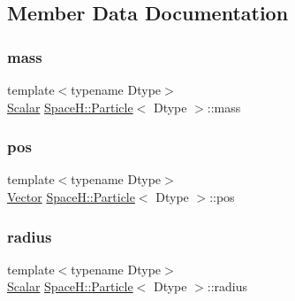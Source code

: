 \subsection{Member Data Documentation}
\mbox{\label{struct_space_h_1_1_particle_a642b596f6617a351de7def4fd814f48a}} 
\subsubsection{\texorpdfstring{mass}{mass}}
{\footnotesize\ttfamily template$<$typename Dtype$>$ \\
\mbox{\hyperlink{struct_space_h_1_1_particle_ab84dbb32b69069c6876698eec48cc984}{Scalar}} \mbox{\hyperlink{struct_space_h_1_1_particle}{Space\+H\+::\+Particle}}$<$ Dtype $>$\+::mass}

\mbox{\label{struct_space_h_1_1_particle_a8549632782c55a3f209e68b71572a771}} 
\subsubsection{\texorpdfstring{pos}{pos}}
{\footnotesize\ttfamily template$<$typename Dtype$>$ \\
\mbox{\hyperlink{struct_space_h_1_1_particle_afba20bb4c28d27263de384ba6a18f5c3}{Vector}} \mbox{\hyperlink{struct_space_h_1_1_particle}{Space\+H\+::\+Particle}}$<$ Dtype $>$\+::pos}

\mbox{\label{struct_space_h_1_1_particle_a7f6657c414053c18c3f8610acf69a519}} 
\subsubsection{\texorpdfstring{radius}{radius}}
{\footnotesize\ttfamily template$<$typename Dtype$>$ \\
\mbox{\hyperlink{struct_space_h_1_1_particle_ab84dbb32b69069c6876698eec48cc984}{Scalar}} \mbox{\hyperlink{struct_space_h_1_1_particle}{Space\+H\+::\+Particle}}$<$ Dtype $>$\+::radius}

